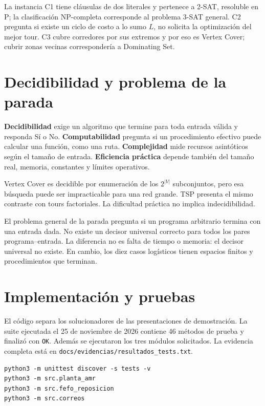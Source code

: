 \documentclass[11pt,a4paper]{article}
\newcommand{\code}[1]{\texttt{#1}}
\begin{document}
La instancia C1 tiene cláusulas de dos literales y pertenece a 2-SAT, resoluble en P; la clasificación NP-completa corresponde al problema 3-SAT general. C2 pregunta si existe un ciclo de costo a lo sumo $L$, no solicita la optimización del mejor tour. C3 cubre corredores por sus extremos y por eso es Vertex Cover; cubrir zonas vecinas correspondería a Dominating Set.

\section{Decidibilidad y problema de la parada}

\textbf{Decidibilidad} exige un algoritmo que termine para toda entrada válida y responda Sí o No. \textbf{Computabilidad} pregunta si un procedimiento efectivo puede calcular una función, como una ruta. \textbf{Complejidad} mide recursos asintóticos según el tamaño de entrada. \textbf{Eficiencia práctica} depende también del tamaño real, memoria, constantes y límites operativos.

Vertex Cover es decidible por enumeración de los $2^{|V|}$ subconjuntos, pero esa búsqueda puede ser impracticable para una red grande. TSP presenta el mismo contraste con tours factoriales. La dificultad práctica no implica indecidibilidad.

El problema general de la parada pregunta si un programa arbitrario termina con una entrada dada. No existe un decisor universal correcto para todos los pares programa--entrada. La diferencia no es falta de tiempo o memoria: el decisor universal no existe. En cambio, los diez casos logísticos tienen espacios finitos y procedimientos que terminan.

\section{Implementación y pruebas}

El código separa los solucionadores de las presentaciones de demostración. La suite ejecutada el 25 de noviembre de 2026 contiene 46 métodos de prueba y finalizó con \code{OK}. Además se ejecutaron los tres módulos solicitados. La evidencia completa está en \code{docs/evidencias/resultados\_tests.txt}.

\begin{lstlisting}
python3 -m unittest discover -s tests -v
python3 -m src.planta_amr
python3 -m src.fefo_reposicion
python3 -m src.correos
\end{lstlisting}
\end{document}

